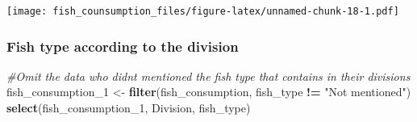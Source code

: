 \documentclass[
]{article}
\newenvironment{Shaded}{\begin{snugshade}}{\end{snugshade}}
\newcommand{\CommentTok}[1]{\textcolor[rgb]{0.56,0.35,0.01}{\textit{#1}}}
\newcommand{\FunctionTok}[1]{\textcolor[rgb]{0.13,0.29,0.53}{\textbf{#1}}}
\newcommand{\NormalTok}[1]{#1}
\newcommand{\OtherTok}[1]{\textcolor[rgb]{0.56,0.35,0.01}{#1}}
\newcommand{\SpecialCharTok}[1]{\textcolor[rgb]{0.81,0.36,0.00}{\textbf{#1}}}
\newcommand{\StringTok}[1]{\textcolor[rgb]{0.31,0.60,0.02}{#1}}
\begin{document}
\texttt{[image: fish\_counsumption\_files/figure-latex/unnamed-chunk-18-1.pdf]}

\hypertarget{fish-type-according-to-the-division}{%
\subsubsection{Fish type according to the
division}\label{fish-type-according-to-the-division}}

\begin{Shaded}
\begin{Highlighting}[]
\CommentTok{\#Omit the data who didn\textquotesingle{}t mentioned the fish type that contains in their divisions}
\NormalTok{fish\_consumption\_1 }\OtherTok{\textless{}{-}} \FunctionTok{filter}\NormalTok{(fish\_consumption, fish\_type }\SpecialCharTok{!=} \StringTok{"Not mentioned"}\NormalTok{) }
                    \FunctionTok{select}\NormalTok{(fish\_consumption\_1, Division, fish\_type)}
\end{Highlighting}
\end{Shaded}
\end{document}
